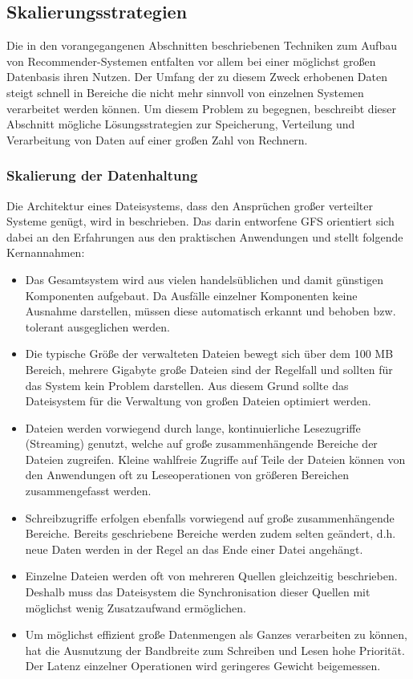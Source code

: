 \subsection{Skalierungsstrategien}
\label{sec:scale}

Die in den vorangegangenen Abschnitten beschriebenen Techniken zum Aufbau von Recommender-Systemen entfalten vor allem bei einer möglichst großen Datenbasis ihren Nutzen. Der Umfang der zu diesem Zweck erhobenen Daten steigt schnell in Bereiche die nicht mehr sinnvoll von einzelnen Systemen verarbeitet werden können.  Um  diesem Problem zu begegnen, beschreibt dieser Abschnitt mögliche Lösungsstrategien zur Speicherung, Verteilung und Verarbeitung von Daten auf einer großen Zahl von Rechnern. %

\subsubsection{Skalierung der Datenhaltung}\label{sec:hfs}

Die Architektur eines Dateisystems, dass den Ansprüchen großer verteilter Systeme genügt, wird in \citep{ghemawat03} beschrieben. Das darin entworfene \acf{GFS} orientiert sich dabei an den Erfahrungen aus den praktischen Anwendungen und stellt folgende Kernannahmen:

\begin{itemize}
\item Das Gesamtsystem wird aus vielen handelsüblichen und damit günstigen Komponenten aufgebaut. Da Ausfälle einzelner Komponenten keine Ausnahme darstellen, müssen diese automatisch erkannt und behoben bzw. tolerant ausgeglichen werden.
\item Die typische Größe der verwalteten Dateien bewegt sich über dem 100 MB Bereich, mehrere Gigabyte große Dateien sind der Regelfall und sollten für das System kein Problem darstellen. Aus diesem Grund sollte das Dateisystem für die Verwaltung von großen Dateien optimiert werden. 
\item Dateien werden vorwiegend durch lange, kontinuierliche Lesezugriffe (Streaming) genutzt, welche auf große zusammenhängende Bereiche der Dateien zugreifen. Kleine wahlfreie Zugriffe auf Teile der Dateien können von den Anwendungen oft zu Leseoperationen von größeren Bereichen zusammengefasst werden.
\item Schreibzugriffe erfolgen ebenfalls vorwiegend auf große zusammenhängende Bereiche. Bereits geschriebene Bereiche werden zudem selten geändert, d.h. neue Daten werden in der Regel an das Ende einer Datei angehängt.
\item Einzelne Dateien werden oft von mehreren Quellen gleichzeitig beschrieben. Deshalb muss das Dateisystem die Synchronisation dieser Quellen mit möglichst wenig Zusatzaufwand ermöglichen.
\item Um möglichst effizient große Datenmengen als Ganzes verarbeiten zu können, hat die Ausnutzung der Bandbreite zum Schreiben und Lesen hohe Priorität. Der Latenz einzelner Operationen wird geringeres Gewicht beigemessen.
\end{itemize}

